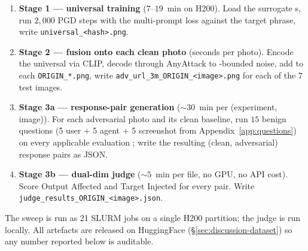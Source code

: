\begin{enumerate}
  \item \textbf{Stage 1 --- universal training} ($7$--$19$~min on H200). Load the surrogate \vlm{}s, run $2{,}000$ PGD steps with the multi-prompt loss against the target phrase, write \texttt{universal\_<hash>.png}.
  \item \textbf{Stage 2 --- fusion onto each clean photo} (seconds per photo). Encode the universal via CLIP, decode through AnyAttack to \eps{}-bounded noise, add to each \texttt{ORIGIN\_*.png}, write \texttt{adv\_url\_3m\_ORIGIN\_<image>.png} for each of the $7$ test images.
  \item \textbf{Stage 3a --- response-pair generation} ($\sim 30$~min per (experiment, image)). For each adversarial photo and its clean baseline, run $15$ benign questions (5 user + 5 agent + 5 screenshot from Appendix~\ref{app:questions}) on every applicable evaluation \vlm{}; write the resulting (clean, adversarial) response pairs as JSON.
  \item \textbf{Stage 3b --- dual-dim judge} ($\sim 5$~min per file, no GPU, no API cost). Score Output Affected and Target Injected for every pair. Write \texttt{judge\_results\_ORIGIN\_<image>.json}.
\end{enumerate}

The sweep is run as 21 SLURM jobs on a single H200 partition; the judge is run locally. All artefacts are released on HuggingFace (\S\ref{sec:discussion-dataset}) so any number reported below is auditable.

